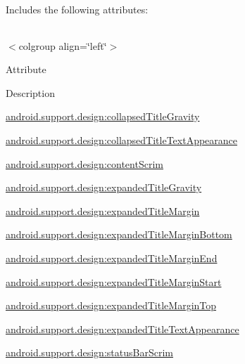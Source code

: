 Includes the following attributes\+:

\tabulinesep=1mm
\begin{longtabu} spread 0pt [c]{*{0}{|X[-1]}|}
\hline
\end{longtabu}
$<$colgroup align=\char`\"{}left\char`\"{}$>$ 

Attribute

Description 

{\ttfamily \hyperlink{classandroid_1_1support_1_1design_1_1R_1_1styleable_a1873cdd61433f0299df88db2300d219e}{android.\+support.\+design\+:collapsed\+Title\+Gravity}}

{\ttfamily \hyperlink{classandroid_1_1support_1_1design_1_1R_1_1styleable_a86e1c80d3c72a9b5420d66a51d90a49f}{android.\+support.\+design\+:collapsed\+Title\+Text\+Appearance}}

{\ttfamily \hyperlink{classandroid_1_1support_1_1design_1_1R_1_1styleable_aaae4497bf3d18eafeeaff35e11812145}{android.\+support.\+design\+:content\+Scrim}}

{\ttfamily \hyperlink{classandroid_1_1support_1_1design_1_1R_1_1styleable_a512c33aaaf433f1d80a20c2664d93cc6}{android.\+support.\+design\+:expanded\+Title\+Gravity}}

{\ttfamily \hyperlink{classandroid_1_1support_1_1design_1_1R_1_1styleable_a7f6c3d7589ba466516400c94b09af6dd}{android.\+support.\+design\+:expanded\+Title\+Margin}}

{\ttfamily \hyperlink{classandroid_1_1support_1_1design_1_1R_1_1styleable_af49b937af4809fe755f0935bab497665}{android.\+support.\+design\+:expanded\+Title\+Margin\+Bottom}}

{\ttfamily \hyperlink{classandroid_1_1support_1_1design_1_1R_1_1styleable_a35cd54b33a367b2c848a150b8b4c8924}{android.\+support.\+design\+:expanded\+Title\+Margin\+End}}

{\ttfamily \hyperlink{classandroid_1_1support_1_1design_1_1R_1_1styleable_a0f562825d10f9717d8465bda7c24e1ad}{android.\+support.\+design\+:expanded\+Title\+Margin\+Start}}

{\ttfamily \hyperlink{classandroid_1_1support_1_1design_1_1R_1_1styleable_aa857ae82aafd5733306283d8cebed1b9}{android.\+support.\+design\+:expanded\+Title\+Margin\+Top}}

{\ttfamily \hyperlink{classandroid_1_1support_1_1design_1_1R_1_1styleable_ac93bbda7f962bc3fa75ce23c2ec87ab8}{android.\+support.\+design\+:expanded\+Title\+Text\+Appearance}}

{\ttfamily \hyperlink{classandroid_1_1support_1_1design_1_1R_1_1styleable_a675be9c93480a98f854416553d174e4b}{android.\+support.\+design\+:status\+Bar\+Scrim}}

